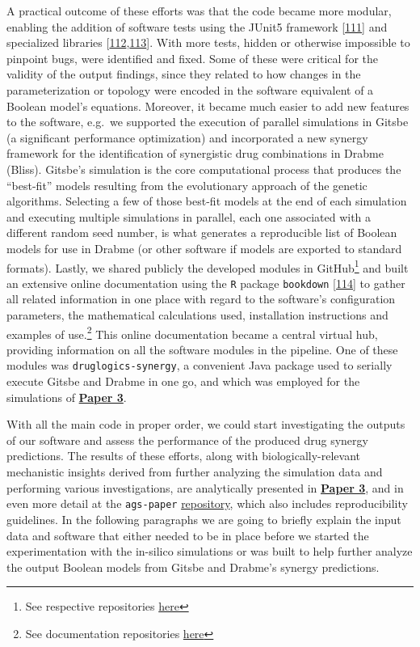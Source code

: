 \documentclass[
  12pt,
]{book}
\begin{document}
A practical outcome of these efforts was that the code became more modular, enabling the addition of software tests using the JUnit5 framework {[}\protect\hyperlink{ref-JUnit5}{111}{]} and specialized libraries {[}\protect\hyperlink{ref-AssertJ}{112},\protect\hyperlink{ref-Mockito-site}{113}{]}.
With more tests, hidden or otherwise impossible to pinpoint bugs, were identified and fixed.
Some of these were critical for the validity of the output findings, since they related to how changes in the parameterization or topology were encoded in the software equivalent of a Boolean model's equations.
Moreover, it became much easier to add new features to the software, e.g.~we supported the execution of parallel simulations in Gitsbe (a significant performance optimization) and incorporated a new synergy framework for the identification of synergistic drug combinations in Drabme (Bliss).
Gitsbe's simulation is the core computational process that produces the ``best-fit'' models resulting from the evolutionary approach of the genetic algorithms.
Selecting a few of those best-fit models at the end of each simulation and executing multiple simulations in parallel, each one associated with a different random seed number, is what generates a reproducible list of Boolean models for use in Drabme (or other software if models are exported to standard formats).
Lastly, we shared publicly the developed modules in GitHub\footnote{See respective repositories \protect\hyperlink{druglogics-soft-links}{here}} and built an extensive online documentation using the \texttt{R} package \texttt{bookdown} {[}\protect\hyperlink{ref-Xie2016}{114}{]} to gather all related information in one place with regard to the software's configuration parameters, the mathematical calculations used, installation instructions and examples of use.\footnote{See documentation repositories \protect\hyperlink{doc-links}{here}}
This online documentation became a central virtual hub, providing information on all the software modules in the pipeline.
One of these modules was \texttt{druglogics-synergy}, a convenient Java package used to serially execute Gitsbe and Drabme in one go, and which was employed for the simulations of \textbf{\protect\hyperlink{Paper3}{Paper 3}}.

With all the main code in proper order, we could start investigating the outputs of our software and assess the performance of the produced drug synergy predictions.
The results of these efforts, along with biologically-relevant mechanistic insights derived from further analyzing the simulation data and performing various investigations, are analytically presented in \textbf{\protect\hyperlink{Paper3}{Paper 3}}, and in even more detail at the \texttt{ags-paper} \protect\hyperlink{misc-links}{repository}, which also includes reproducibility guidelines.
In the following paragraphs we are going to briefly explain the input data and software that either needed to be in place before we started the experimentation with the in-silico simulations or was built to help further analyze the output Boolean models from Gitsbe and Drabme's synergy predictions.
\end{document}
